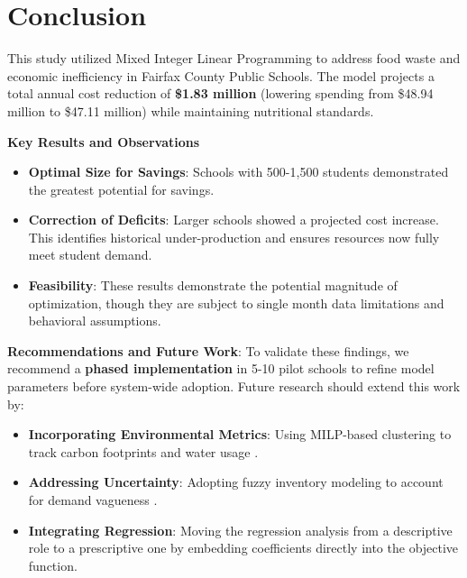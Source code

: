 \documentclass{scrartcl}
\begin{document}

\section{Conclusion}

This study utilized Mixed Integer Linear Programming to address food waste and economic inefficiency in Fairfax County Public Schools. The model projects a total annual cost reduction of \textbf{\$1.83 million} (lowering spending from \$48.94 million to \$47.11 million) while maintaining nutritional standards.

\textbf{Key Results and Observations}
\begin{itemize}
    \item \textbf{Optimal Size for Savings}: Schools with 500-1,500 students demonstrated the greatest potential for savings.
    \item \textbf{Correction of Deficits}: Larger schools showed a projected cost increase. This identifies historical under-production and ensures resources now fully meet student demand.
    \item \textbf{Feasibility}: These results demonstrate the potential magnitude of optimization, though they are subject to single month data limitations and behavioral assumptions.
\end{itemize}

\textbf{Recommendations and Future Work}: To validate these findings, we recommend a \textbf{phased implementation} in 5-10 pilot schools to refine model parameters before system-wide adoption. Future research should extend this work by:
\begin{itemize}
    \item \textbf{Incorporating Environmental Metrics}: Using MILP-based clustering to track carbon footprints and water usage \cite{oliva}.
    \item \textbf{Addressing Uncertainty}: Adopting fuzzy inventory modeling to account for demand vagueness \cite{kalaiarasi}.
    \item \textbf{Integrating Regression}: Moving the regression analysis from a descriptive role to a prescriptive one by embedding coefficients directly into the objective function.
\end{itemize}



\end{document}

